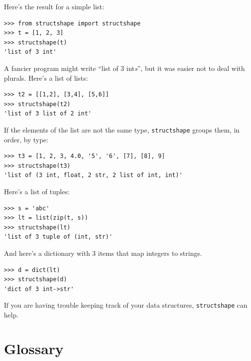 Here's the result for a simple list:

\begin{lstlisting}
>>> from structshape import structshape
>>> t = [1, 2, 3]
>>> structshape(t)
'list of 3 int'
\end{lstlisting}
%
A fancier program might write ``list of 3 int{\em s}'', but it
was easier not to deal with plurals.  Here's a list of lists:

\begin{lstlisting}
>>> t2 = [[1,2], [3,4], [5,6]]
>>> structshape(t2)
'list of 3 list of 2 int'
\end{lstlisting}
%
If the elements of the list are not the same type,
{\tt structshape} groups them, in order, by type:

\begin{lstlisting}
>>> t3 = [1, 2, 3, 4.0, '5', '6', [7], [8], 9]
>>> structshape(t3)
'list of (3 int, float, 2 str, 2 list of int, int)'
\end{lstlisting}
%
Here's a list of tuples:

\begin{lstlisting}
>>> s = 'abc'
>>> lt = list(zip(t, s))
>>> structshape(lt)
'list of 3 tuple of (int, str)'
\end{lstlisting}
%
And here's a dictionary with 3 items that map integers to strings.

\begin{lstlisting}
>>> d = dict(lt)
>>> structshape(d)
'dict of 3 int->str'
\end{lstlisting}
%
If you are having trouble keeping track of your data structures,
{\tt structshape} can help.


\section{Glossary}

